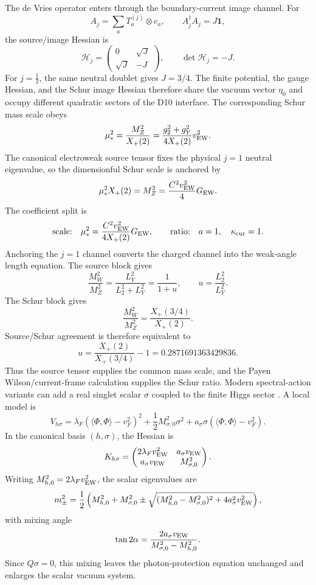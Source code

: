\documentclass[11pt]{article}
\theoremstyle{definition}
\theoremstyle{remark}
\newcommand{\half}{\tfrac12}
\newcommand{\cH}{\mathcal H}
\begin{document}
The de Vries operator enters through the boundary-current image channel.  For
\[
  A_j=\sum_aT_a^{(j)}\otimes e_a,\qquad A_j^\dagger A_j=J\bm1,
\]
the source/image Hessian is
\[
  \cH_j=
  \begin{pmatrix}
  0&\sqrt J\\
  \sqrt J&-J
  \end{pmatrix},
  \qquad
  \det\cH_j=-J.
\]
For \(j=\half\), the same neutral doublet gives \(J=3/4\).  The finite
potential, the gauge Hessian, and the Schur image Hessian therefore share the
vacuum vector \(\eta_0\) and occupy different quadratic sectors of the D10
interface.
The corresponding Schur mass scale obeys
\[
  \mu_*^2=\frac{M_Z^2}{X_+(2)}
  =
  \frac{g_2^2+g_Y^2}{4X_+(2)}v_{\rm EW}^2.
\]
The canonical electroweak source tensor fixes the physical \(j=1\) neutral
eigenvalue, so the dimensionful Schur scale is anchored by
\[
  \mu_*^2X_+(2)=
  M_Z^2
  =
  \frac{C^2v_{\rm EW}^2}{4}G_{\rm EW}.
\]
The coefficient split is
\[
  \hbox{scale:}\quad
  \mu_*^2=
  \frac{C^2v_{\rm EW}^2}{4X_+(2)}G_{\rm EW},
  \qquad
  \hbox{ratio:}\quad
  a=1,\quad \kappa_{\rm cur}=1.
\]
Anchoring the \(j=1\) channel converts the charged channel into the
weak-angle length equation.  The source block gives
\[
  \frac{M_W^2}{M_Z^2}
  =
  \frac{L_Y^2}{L_2^2+L_Y^2}
  =
  \frac{1}{1+u},
  \qquad
  u=\frac{L_2^2}{L_Y^2}.
\]
The Schur block gives
\[
  \frac{M_W^2}{M_Z^2}
  =
  \frac{X_+(3/4)}{X_+(2)}.
\]
Source/Schur agreement is therefore equivalent to
\[
  u=
  \frac{X_+(2)}{X_+(3/4)}-1
  =
  0.2871691363429836.
\]
Thus the source tensor supplies the common mass scale, and the Payen
Wilson/current-frame calculation supplies the Schur ratio.
Modern spectral-action variants can add a real singlet scalar \(\sigma\)
coupled to the finite Higgs sector
\cite{ChamseddineConnes2012,ChamseddineConnesVanSuijlekom2013a,
ChamseddineConnesVanSuijlekom2013b,Martinetti2015,
FilaciMartinettiPesco2020}.  A local model is
\[
  V_{h\sigma}
  =
  \lambda_F(\langle\Phi,\Phi\rangle-v_F^2)^2
  +\frac12M_{\sigma,0}^2\sigma^2
  +a_\sigma\sigma(\langle\Phi,\Phi\rangle-v_F^2).
\]
In the canonical basis \((h,\sigma)\), the Hessian is
\[
  K_{h\sigma}=
  \begin{pmatrix}
  2\lambda_Fv_{\rm EW}^2&a_\sigma v_{\rm EW}\\
  a_\sigma v_{\rm EW}&M_{\sigma,0}^2
  \end{pmatrix}.
\]
Writing \(M_{h,0}^2=2\lambda_Fv_{\rm EW}^2\), the scalar eigenvalues are
\[
  m_\pm^2=
  \frac12\left(
  M_{h,0}^2+M_{\sigma,0}^2
  \pm
  \sqrt{(M_{h,0}^2-M_{\sigma,0}^2)^2
  +4a_\sigma^2v_{\rm EW}^2}
  \right),
\]
with mixing angle
\[
  \tan 2\alpha
  =
  \frac{2a_\sigma v_{\rm EW}}
       {M_{\sigma,0}^2-M_{h,0}^2}.
\]
Since \(Q\sigma=0\), this mixing leaves the photon-protection equation
unchanged and enlarges the scalar vacuum system.
\end{document}
